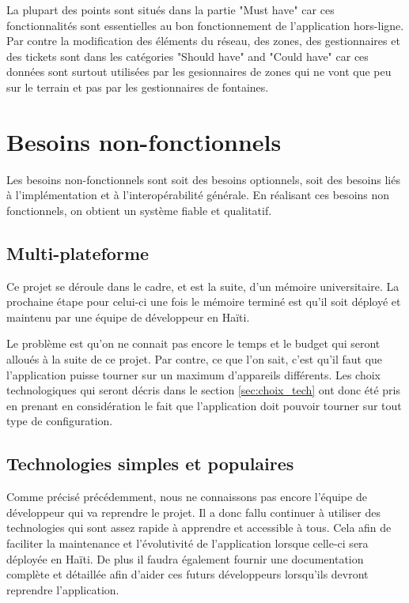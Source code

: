 \documentclass{EPL-master-thesis-covers-FR}
\begin{document}
				La plupart des points sont situés dans la partie "Must have" car ces fonctionnalités sont essentielles au bon fonctionnement de l'application hors-ligne. Par contre la modification des éléments du réseau, des zones, des gestionnaires et des tickets sont dans les catégories "Should have" and "Could have" car ces données sont surtout utilisées par les gesionnaires de zones qui ne vont que peu sur le terrain et pas par les gestionnaires de fontaines.			

		\section{Besoins non-fonctionnels}
			Les besoins non-fonctionnels sont soit des besoins optionnels, soit des besoins liés à l'implémentation et à l'interopérabilité générale. En réalisant ces besoins non fonctionnels, on obtient un système fiable et qualitatif.
					
			\subsection*{Multi-plateforme}
			\label{sec:multi}
				Ce projet se déroule dans le cadre, et est la suite, d'un mémoire universitaire. La prochaine étape pour celui-ci une fois le mémoire terminé est qu'il soit déployé et maintenu par une équipe de développeur en Haïti. 
				
				Le problème est qu'on ne connait pas encore le temps et le budget qui seront alloués à la suite de ce projet. Par contre, ce que l'on sait, c'est qu'il faut que l'application puisse tourner sur un maximum d'appareils différents. Les choix technologiques qui seront décris dans le section \ref{sec:choix_tech} ont donc été pris en prenant en considération le fait que l'application doit pouvoir tourner sur tout type de configuration.
				
			\subsection*{Technologies simples et populaires}
				Comme précisé précédemment, nous ne connaissons pas encore l'équipe de développeur qui va reprendre le projet. Il a donc fallu continuer à utiliser des technologies qui sont assez rapide à apprendre et accessible à tous. Cela afin de faciliter la maintenance et l'évolutivité de l'application lorsque celle-ci sera déployée en Haïti.	
				De plus il faudra également fournir une documentation complète et détaillée afin d'aider ces futurs développeurs lorsqu'ils devront reprendre l'application.
				
\end{document}

